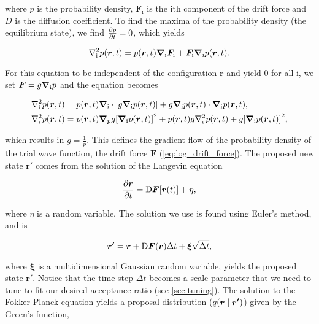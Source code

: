 where $p$ is the probability density, $\bm{F}_{\mathrm{i}}$ is the $\mathrm{i}$th component of the drift force and $D$ is the diffusion coefficient. To find the maxima of the probability density (the equilibrium state), we find $\pdv{p}{t} = 0$, which yields

\begin{equation*}
    \laplacian_{\mathrm{i}} p(\bm{r}, t) = p(\bm{r}, t)\grad_{\mathrm{i}}\bm{F}_{\mathrm{i}} + \bm{F}_{\mathrm{i}}\grad_{\mathrm{i}}p(\bm{r}, t). 
\end{equation*}

For this equation to be independent of the configuration $\bm{r}$ and yield $0$ for all $\mathrm{i}$, we set $\bm{F} = g\grad_{\mathrm{i}}p$ and the equation becomes 

\begin{align*}
    &\laplacian_{\mathrm{i}}p(\bm{r}, t) = p(\bm{r}, t)\grad_{\mathrm{i}}\cdot\qty[g\grad_{\mathrm{i}}p(\bm{r}, t)] + g\grad_{\mathrm{i}}p(\bm{r}, t)\cdot\grad_{\mathrm{i}}p(\bm{r}, t),
    \\
    &\laplacian_{\mathrm{i}}p(\bm{r}, t) = p(\bm{r}, t)\grad_{p}g\qty[\grad_{\mathrm{i}}p(\bm{r}, t)]^2 + p(\bm{r}, t)g\laplacian_{\mathrm{i}}p(\bm{r}, t) + g\qty[\grad_{\mathrm{i}}p(\bm{r}, t)]^2, 
\end{align*} 

which results in $g=\frac{1}{p}$. This defines the gradient flow of the probability density of the trial wave function, the drift force $\bm{F}$ (\autoref{eq:log_drift_force}). The proposed new state $\bm{r'}$ comes from the solution of the Langevin equation 

\begin{equation}\label{eq:langevin}
    \pdv{\bm{r}}{t} = \mathrm{D}\bm{F}\qty[\bm{r}(t)] + \eta, 
\end{equation}

where $\eta$ is a random variable. The solution we use is found using Euler's method, and is 

\begin{equation}
    \bm{r'} = \bm{r} + \mathrm{D}\bm{F}\qty(\bm{r})\Delta t + \bm{\xi}\sqrt{\Delta t},
\end{equation}

where $\bm{\xi}$ is a multidimensional Gaussian random variable, yields the proposed state $\bm{r'}$. Notice that the time-step $\Delta t$ becomes a scale parameter that we need to tune to fit our desired acceptance ratio (see \autoref{sec:tuning}). The solution to the Fokker-Planck equation yields a proposal distribution ($q\qty(\bm{r}\mid\bm{r'})$) given by the Green's function,  

